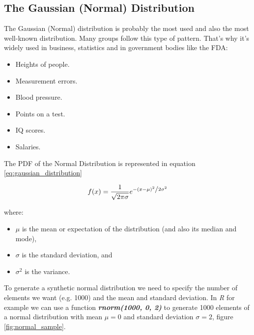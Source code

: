 \subsection{The Gaussian (Normal) Distribution}
The Gaussian (Normal) distribution is probably the most used and also the most well-known distribution. Many groups follow this type of pattern. That's why it's widely used in business, statistics and in government bodies like the FDA:
\begin{itemize}
\item Heights of people.
\item Measurement errors.
\item Blood pressure.
\item Points on a test.
\item IQ scores.
\item Salaries.
\end{itemize}

The PDF of the Normal Distribution is represented in equation \ref{eq:gaussian_distribution}

\begin{equation}\label{eq:gaussian_distribution}
f(x) = \frac{1}{{ \sqrt {2\pi \sigma} }}e^{{{ - \left( {x - \mu } \right)^2 } \mathord{\left/ {\vphantom {{ - \left( {x - \mu } \right)^2 } {2\sigma ^2 }}} \right. \kern-\nulldelimiterspace} {2\sigma ^2 }}}
\end{equation}

where:
\begin{itemize}
\item $\mu$ is the mean or expectation of the distribution (and also its median and mode),
\item $\sigma$ is the standard deviation, and
\item $\sigma^2$ is the variance.
\end{itemize}

To generate a synthetic normal distribution we need to specify the number of elements we want (e.g. 1000) and the mean and standard deviation. In \textit{R} for example we can use a function \textbf{\textit{rnorm(1000, 0, 2)}} to generate 1000 elements of a normal distribution with mean $\mu = 0$ and standard deviation $\sigma = 2$, figure \ref{fig:normal_sample}.


